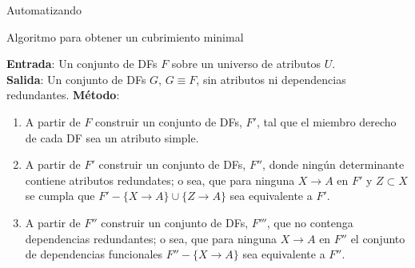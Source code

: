 \begin{frame}{Automatizando}
    \begin{block}{Algoritmo para obtener un cubrimiento minimal}
        
        \textbf{Entrada}: Un conjunto de DFs $F$ sobre un universo de atributos $U$.\\
        \textbf{Salida}: Un conjunto de DFs $G$, $G \equiv F$, sin atributos ni dependencias redundantes.
        \pause
        \textbf{M\'etodo}:
        \begin{enumerate}[<+->]
            \item A partir de $F$ construir un conjunto de DFs, $F'$, tal que el miembro derecho de cada DF sea un atributo simple.
            \item A partir de $F'$ construir un conjunto de DFs, $F''$, donde ning\'un determinante contiene atributos redundates; o sea,
            que para ninguna $X \to A$ en $F'$ y $Z \subset X$ se cumpla que
            $F' - \{X \to A\} \cup \{Z \to A\}$ sea equivalente a $F'$.
            \item A partir de $F''$ construir un conjunto de DFs, $F'''$, que no contenga dependencias
            redundantes; o sea, que para ninguna $X \to A$ en $F''$ el conjunto de
            dependencias funcionales $F'' - \{X \to A\}$ sea equivalente a $F''$.
        \end{enumerate}
    \end{block}
\end{frame}

